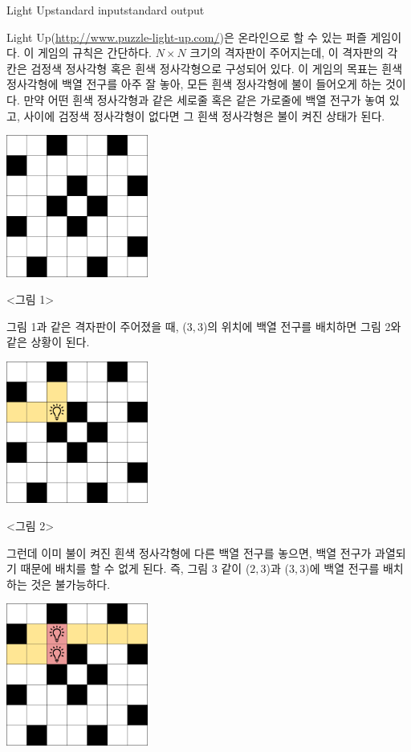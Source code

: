 \begin{problem}{Light Up}{standard input}{standard output}

Light Up(\url{http://www.puzzle-light-up.com/})은 온라인으로 할 수 있는 퍼즐 게임이다. 
이 게임의 규칙은 간단하다. $N \times N$ 크기의 격자판이 주어지는데, 이 격자판의 각 칸은 검정색 정사각형 혹은 흰색 정사각형으로 구성되어 있다. 
이 게임의 목표는 흰색 정사각형에 백열 전구를 아주 잘 놓아, 모든 흰색 정사각형에 불이 들어오게 하는 것이다. 
만약 어떤 흰색 정사각형과 같은 세로줄 혹은 같은 가로줄에 백열 전구가 놓여 있고, 사이에 검정색 정사각형이 없다면 그 흰색 정사각형은 불이 켜진 상태가 된다.

\begin{center}
  \includegraphics[width=0.35\textwidth]{figure1.png}

  <그림 1>
\end{center}

그림 1과 같은 격자판이 주어졌을 때, ($3, 3$)의 위치에 백열 전구를 배치하면 그림 2와 같은 상황이 된다.

\begin{center}
  \includegraphics[width=0.35\textwidth]{figure2.png}

  <그림 2>
\end{center}

그런데 이미 불이 켜진 흰색 정사각형에 다른 백열 전구를 놓으면, 백열 전구가 과열되기 때문에 배치를 할 수 없게 된다. 
즉, 그림 3 같이 ($2, 3$)과 ($3, 3$)에 백열 전구를 배치하는 것은 불가능하다.

\begin{center}
  \includegraphics[width=0.35\textwidth]{figure3.png}


\end{center}
\end{problem}
